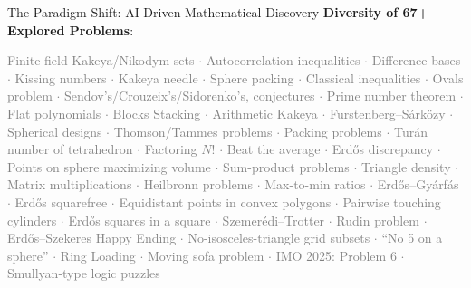 \documentclass[10pt, aspectratio=169]{beamer}
\begin{document}
\begin{frame}{The Paradigm Shift: AI-Driven Mathematical Discovery}
    \vspace{0.2cm}
    \textbf{Diversity of 67+ Explored Problems}:
    \begin{center}
    \tiny \linespread{0.8}\selectfont
    \textcolor{gray}{
    Finite field Kakeya/Nikodym sets $\cdot$ Autocorrelation inequalities $\cdot$ Difference bases $\cdot$ Kissing numbers $\cdot$ Kakeya needle $\cdot$ Sphere packing $\cdot$ Classical inequalities $\cdot$ Ovals problem $\cdot$ Sendov’s/Crouzeix’s/Sidorenko’s, conjectures $\cdot$ Prime number theorem $\cdot$ Flat polynomials $\cdot$ Blocks Stacking $\cdot$ Arithmetic Kakeya $\cdot$ Furstenberg–Sárközy $\cdot$ Spherical designs $\cdot$ Thomson/Tammes problems $\cdot$ Packing problems $\cdot$ Turán number of tetrahedron $\cdot$ Factoring $N!$ $\cdot$ Beat the average $\cdot$ Erdős discrepancy $\cdot$ Points on sphere maximizing volume $\cdot$ Sum-product problems $\cdot$ Triangle density $\cdot$ Matrix multiplications $\cdot$ Heilbronn problems $\cdot$ Max-to-min ratios $\cdot$ Erdős–Gyárfás $\cdot$ Erdős squarefree $\cdot$ Equidistant points in convex polygons $\cdot$ Pairwise touching cylinders $\cdot$ Erdős squares in a square $\cdot$ Szemerédi–Trotter $\cdot$ Rudin problem $\cdot$ Erdős–Szekeres Happy Ending $\cdot$ No-isosceles-triangle grid subsets $\cdot$ “No 5 on a sphere” $\cdot$ Ring Loading $\cdot$ Moving sofa problem $\cdot$ IMO 2025: Problem 6 $\cdot$ Smullyan-type logic puzzles
    }
    \end{center}
\end{frame}
\end{document}
